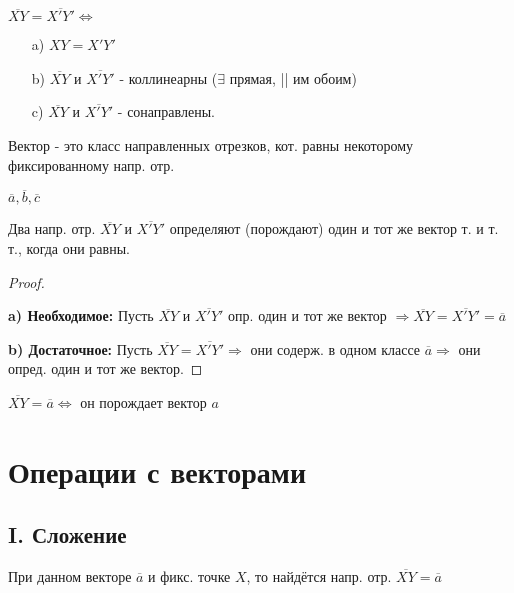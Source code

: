 \begin{definition}
$\overline{XY} = \overline{X'Y'} \iff $
\begin{itemize}
    \item [a) ] $XY = X'Y'$
    \item [b) ] $\overline{XY}$ и $\overline{X'Y'}$ - коллинеарны ($\exists $ прямая, || им обоим)
    \item [c) ] $\overline{XY} \text{ и } \overline{X'Y'}$ - сонаправлены.
\end{itemize}
\end{definition}

\begin{definition}
Вектор - это класс направленных отрезков, кот. равны некоторому фиксированному напр. отр.
\end{definition}
\begin{symb}
    $\overline{a}, \overline{b}, \overline{c}$
\end{symb}

\begin{statement}
Два напр. отр. $\overline{XY}$ и $\overline{X'Y'}$ определяют (порождают) один и тот же вектор т. и т. т., когда они равны.
\end{statement}
\begin{proof}
~\newline

\textbf{a) Необходимое: } Пусть $\overline{XY}$ и $\overline{X'Y'}$ опр. один и тот же вектор $ \Rightarrow \overline{XY} = \overline{X'Y'} = \overline{a}$
 
\textbf{b) Достаточное: } Пусть $\overline{XY} = \overline{X'Y'} \Rightarrow $ они содерж. в одном классе $\overline{a} \Rightarrow $  они опред. один и тот же вектор.
\end{proof}
\begin{definition}
$\overline{XY} = \overline{a} \iff $ он порождает вектор $a$
\end{definition}

\section{Операции с векторами}
\subsection{I. Сложение}
\begin{note}
При данном векторе $\overline{a}$ и фикс. точке $X$, то найдётся напр. отр. $\overline{XY} = \overline{a}$
\end{note}

